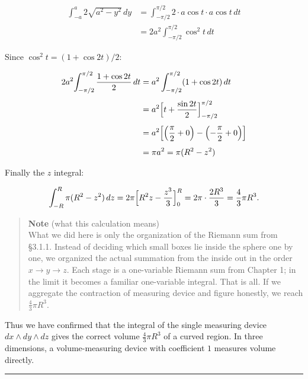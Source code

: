 \[\begin{aligned}
\int_{-a}^{a} 2\sqrt{a^2 - y^2}\,dy
&= \int_{-\pi/2}^{\pi/2} 2\cdot a\cos t \cdot a\cos t\,dt \\
&= 2a^2\!\int_{-\pi/2}^{\pi/2} \cos^2 t\,dt
\end{aligned}\]

Since \(\cos^2 t = (1 + \cos 2t)/2\):

\[\begin{aligned}
2a^2\!\int_{-\pi/2}^{\pi/2} \frac{1 + \cos 2t}{2}\,dt
&= a^2\int_{-\pi/2}^{\pi/2} (1 + \cos 2t)\,dt \\[4pt]
&= a^2\Bigl[t + \frac{\sin 2t}{2}\Bigr]_{-\pi/2}^{\pi/2} \\[4pt]
&= a^2\Bigl[\Bigl(\frac{\pi}{2} + 0\Bigr) - \Bigl(-\frac{\pi}{2} + 0\Bigr)\Bigr] \\[4pt]
&= \pi a^2 = \pi(R^2 - z^2)
\end{aligned}\]

Finally the \(z\) integral:

\[\int_{-R}^{R} \pi(R^2 - z^2)\,dz = 2\pi\Bigl[R^2 z - \frac{z^3}{3}\Bigr]_{0}^{R} = 2\pi\cdot\frac{2R^3}{3} = \frac{4}{3}\pi R^3.\]

\begin{quote}
\textbf{Note} (what this calculation means)\\
What we did here is only the organization of the Riemann sum from
§3.1.1. Instead of deciding which small boxes lie inside the sphere one
by one, we organized the actual summation from the inside out in the
order \(x \to y \to z\). Each stage is a one-variable Riemann sum from
Chapter 1; in the limit it becomes a familiar one-variable integral.
That is all. If we aggregate the contraction of measuring device and
figure honestly, we reach \(\frac{4}{3}\pi R^3\).
\end{quote}

Thus we have confirmed that the integral of the single measuring device
\(dx \wedge dy \wedge dz\) gives the correct volume
\(\frac{4}{3}\pi R^3\) of a curved region. In three dimensions, a
volume-measuring device with coefficient \(1\) measures volume directly.

\begin{center}\rule{0.5\linewidth}{0.5pt}\end{center}


